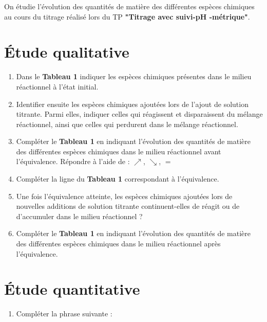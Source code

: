 \documentclass[a4paper,11pt,fleqn]{article}%
\begin{document}
\maketitle

On étudie l'évolution des quantités de matière des différentes espèces chimiques au cours du titrage réalisé lors du TP \textbf{\textsf{"Titrage avec suivi-pH -métrique"}}.
\section{Étude qualitative}
\begin{enumerate}
	\item Dans le \textbf{Tableau 1} indiquer les espèces chimiques présentes dans le milieu réactionnel à l'état initial.
	\item Identifier ensuite les espèces chimiques ajoutées lors de l'ajout de solution titrante. Parmi elles, indiquer celles qui réagissent et disparaissent du mélange réactionnel, ainsi que celles qui perdurent dans le mélange réactionnel.
	\item Compléter le \textbf{Tableau 1} en indiquant l'évolution des quantités de matière des différentes espèces chimiques dans le milieu réactionnel avant l'équivalence. Répondre à l'aide de : $\nearrow$, $\searrow$, $=$
	\item Compléter la ligne du \textbf{Tableau 1} correspondant à l'équivalence.
	\item Une fois l'équivalence atteinte, les espèces chimiques ajoutées lors de nouvelles additions de solution titrante continuent-elles de réagit ou de d'accumuler dans le milieu réactionnel ?
	\item Compléter le \textbf{Tableau 1} en indiquant l'évolution des quantités de matière des différentes espèces chimiques dans le milieu réactionnel après l'équivalence.
\end{enumerate}

\section{Étude quantitative}
\begin{enumerate}[resume]
	\item Compléter la phrase suivante :
\end{enumerate}
\end{document}
